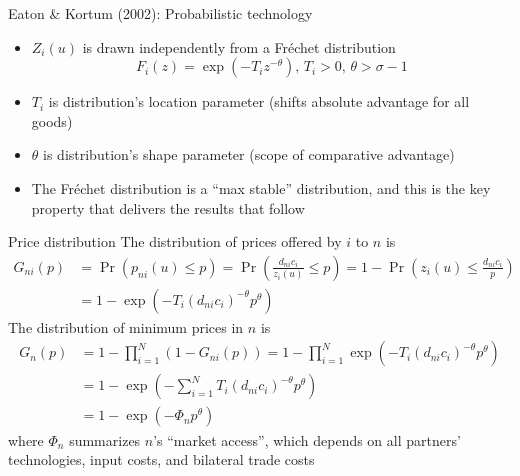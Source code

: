 \documentclass[11pt,notes=hide,aspectratio=169]{beamer}
\begin{document}
\begin{frame}{Eaton \& Kortum (2002): Probabilistic technology}
\begin{itemize}
	\item $Z_i(u)$ is drawn independently from a Fr\'{e}chet distribution
	\begin{equation*}
	F_{i}\left( z\right) =\exp \left( -T_{i}z^{-\theta }\right) \text{, \ \ \ \ }%
	T_{i}>0\text{, } \theta>\sigma-1
	\end{equation*}
	\item $T_i$ is distribution's location parameter (shifts absolute advantage for all goods)
	\item $\theta$ is distribution's shape parameter (scope of comparative advantage)
	\item The Fr\'{e}chet distribution is a ``max stable'' distribution, and this is the key property that delivers the results that follow
\end{itemize}
\end{frame}
\begin{frame}{Price distribution}
The distribution of prices offered by $i$ to $n$ is
\begin{align*}
G_{ni}\left( p\right) 
&=\Pr \left( p_{ni}(u) \leq p\right)
=\Pr \left( \frac{d _{ni}c_{i}}{z_{i}(u) }\leq p\right)
=1-\Pr \left( z_{i}(u) \leq \frac{d _{ni}c_{i}}{p}\right) \\
&=1-\exp \left( -T_{i}\left( d _{ni}c_{i}\right) ^{-\theta}p^{\theta}\right)
\end{align*}
The distribution of minimum prices in $n$ is
\begin{align*}
G_{n}\left( p\right) 
&=1-\prod_{i=1}^{N}\left( 1-G_{ni}\left( p\right) \right)
=1-\prod_{i=1}^{N}\exp \left( -T_{i}\left(d_{ni}c_{i}\right) ^{-\theta}p^{\theta }\right) \\
&=1-\exp \left(-{\sum_{i=1}^{N}T_{i}\left(d_{ni}c_{i}\right) ^{-\theta}}p^{\theta }\right) \\
&=1-\exp \left( -\Phi _{n}p^{\theta }\right)
\end{align*}
where $\Phi_{n}$ summarizes $n$'s ``market access'',
which depends on all partners' technologies, input costs, and bilateral trade costs
\end{frame}
\end{document}
